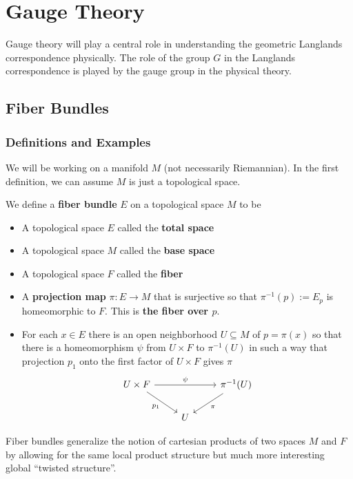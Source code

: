 \chapter{Gauge Theory\label{ch:gauge}}

	Gauge theory will play a central role in understanding the geometric Langlands correspondence physically. The role of the group $G$ in the Langlands correspondence is played by the gauge group in the physical theory. 

	\section{Fiber Bundles}
	\subsection{Definitions and Examples} %
	\label{sub:definitions_and_examples}
	
	
		We will be working on a manifold $M$ (not necessarily Riemannian). In the first definition, we can assume $M$ is just a topological space. 
	\begin{defn}
		We define a \textbf{fiber bundle} $E$ on a topological space $M$ to be
		\begin{itemize}
			\item A topological space $E$ called the \textbf{total space}
			\item A topological space $M$ called the \textbf{base space}
			\item A topological space $F$ called the \textbf{fiber} 
			\item A \textbf{projection map} $\pi: E \to M$ that is surjective so that $\pi^{-1}(p) := E_p$ is homeomorphic to $F$. This is \textbf{the fiber over $p$}.
			\item For each $x \in E$ there is an open neighborhood $U \subseteq M$ of $p = \pi(x)$ so that there is a homeomorphism $\psi$ from $U \times F$ to $\pi^{-1}(U)$ in such a way that projection $p_1$ onto the first factor of $U \times F$ gives $\pi$
			\[
			\begin{tikzcd}
				U \times F \arrow[rd,swap,"p_1"] \arrow[rr,"\psi"] && \pi^{-1}(U) \arrow[dl,"\pi"]\\
				& U &
			\end{tikzcd}
			\]
		\end{itemize}
	\end{defn}
	Fiber bundles generalize the notion of cartesian products of two spaces $M$ and $F$ by allowing for the same local product structure but much more interesting global ``twisted structure''. 
	
